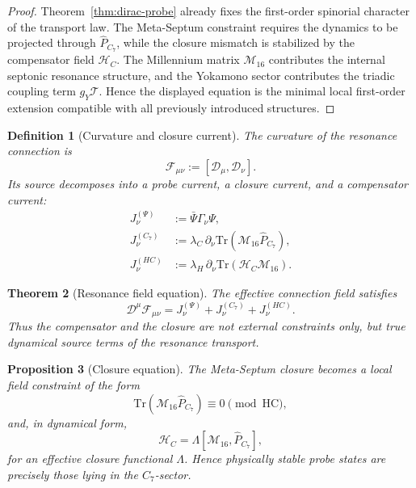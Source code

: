 \documentclass[12pt,a4paper]{article}
\newtheorem{theorem}{Theorem}[section]
\newtheorem{proposition}[theorem]{Proposition}
\newtheorem{definition}[theorem]{Definition}
\begin{document}
\begin{proof}
Theorem~\ref{thm:dirac-probe} already fixes the first-order spinorial
character of the transport law.
The Meta-Septum constraint requires the dynamics to be projected through
$\hat P_{C_7}$, while the closure mismatch is stabilized by the
compensator field $\mathcal H_C$.
The Millennium matrix $\mathcal M_{16}$ contributes the internal
septonic resonance structure, and the Yokamono sector contributes the
triadic coupling term $g_Y\mathcal T$.
Hence the displayed equation is the minimal local first-order extension
compatible with all previously introduced structures.
\end{proof}

\begin{definition}[Curvature and closure current]
The curvature of the resonance connection is
\[
  \mathcal F_{\mu\nu} := [\mathcal D_\mu,\mathcal D_\nu].
\]
Its source decomposes into a probe current, a closure current, and a
compensator current:
\begin{align*}
  J^{(\Psi)}_\nu &:= \bar\Psi\Gamma_\nu\Psi,\\
  J^{(C_7)}_\nu &:= \lambda_C\,\partial_\nu
    \mathrm{Tr}(\mathcal M_{16}\hat P_{C_7}),\\
  J^{(HC)}_\nu &:= \lambda_H\,\partial_\nu
    \mathrm{Tr}(\mathcal H_C\mathcal M_{16}).
\end{align*}
\end{definition}

\begin{theorem}[Resonance field equation]
The effective connection field satisfies
\[
  \mathcal D^\mu\mathcal F_{\mu\nu}
  =
  J^{(\Psi)}_\nu + J^{(C_7)}_\nu + J^{(HC)}_\nu.
\]
Thus the compensator and the closure are not external constraints only,
but true dynamical source terms of the resonance transport.
\end{theorem}

\begin{proposition}[Closure equation]
The Meta-Septum closure becomes a local field constraint of the form
\[
  \mathrm{Tr}(\mathcal M_{16}\hat P_{C_7})
  \equiv 0 \pmod{\mathrm{HC}},
\]
and, in dynamical form,
\[
  \mathcal H_C = \Lambda[\mathcal M_{16},\hat P_{C_7}],
\]
for an effective closure functional $\Lambda$.
Hence physically stable probe states are precisely those lying in the
$C_7$-sector.
\end{proposition}
\end{document}

